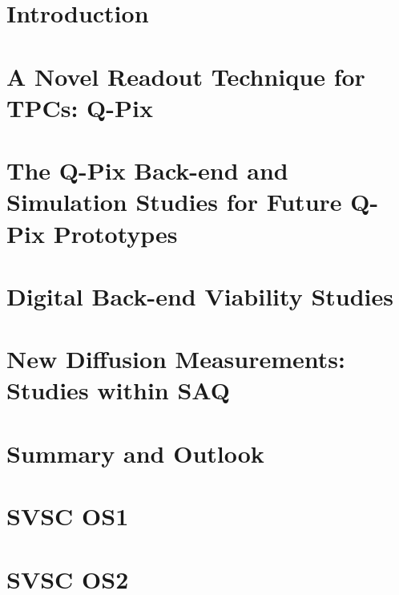 \documentclass[12pt]{uh_thesis}
\begin{document}
\chapter{Introduction}
\label{chap:intro}


\chapter{A Novel Readout Technique for TPCs: Q-Pix}
\label{chap:qpix}


\chapter{The Q-Pix Back-end and Simulation Studies for Future Q-Pix Prototypes}
\label{chap:sim}


\chapter{Digital Back-end Viability Studies}
\label{chap:qdb}


\chapter{New Diffusion Measurements: Studies within SAQ}
\label{chap:saq}


\chapter{Summary and Outlook}
\label{chap:summary}


\printbibliography[heading=bibintoc]

\appendix
\chapter{SVSC OS1}
\label{chap:OS1}



\chapter{SVSC OS2}
\label{chap:OS2}



\printindex
\end{document}

